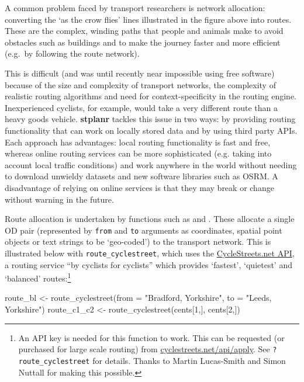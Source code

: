 A common problem faced by transport researchers is network allocation:
converting the `as the crow flies' lines illustrated in the figure above
into routes. These are the complex, winding paths that people and
animals make to avoid obstacles such as buildings and to make the
journey faster and more efficient (e.g.~by following the route network).

This is difficult (and was until recently near impossible using free
software) because of the size and complexity of transport networks, the
complexity of realistic routing algorithms and need for
context-specificity in the routing engine. Inexperienced cyclists, for
example, would take a very different route than a heavy goods vehicle.
\textbf{stplanr} tackles this issue in two ways: by providing routing
functionality that can work on locally stored data and by using third party APIs.
Each approach has advantages: local routing functionality is fast and free,
whereas online routing services can be more sophisticated (e.g. taking
into account local traffic conditions) and work anywhere in the world
without needing to download unwieldy datasets and new software libraries such
as OSRM.
A disadvantage of relying on online services is that they may break or change
without warning in the future.

Route allocation is undertaken by  functions such as
 and \linebreak {}.
These allocate a single OD pair (represented by \texttt{from} and \texttt{to}
arguments as coordinates,
spatial point objects or text strings to be
`geo-coded') to the transport network.
This is illustrated
below with \texttt{route\_cyclestreet}, which uses the
\href{http://www.cyclestreets.net/api/}{CycleStreets.net API}, a routing
service ``by cyclists for cyclists'' which provides
`fastest', `quietest' and `balanced' routes:\footnote{An
API key
  is needed for this function to work. This can be requested (or
  purchased for large scale routing) from
  \href{https://www.cyclestreets.net/api/apply/}{cyclestreets.net/api/apply}.
  See \texttt{?route\_cyclestreet} for details. Thanks to Martin
  Lucas-Smith and Simon Nuttall for making this possible.}

\begin{Schunk}
\begin{Sinput}
route_bl <- route_cyclestreet(from = "Bradford, Yorkshire", to = "Leeds, Yorkshire")
route_c1_c2 <- route_cyclestreet(cents[1,], cents[2,])
\end{Sinput}
\end{Schunk}

